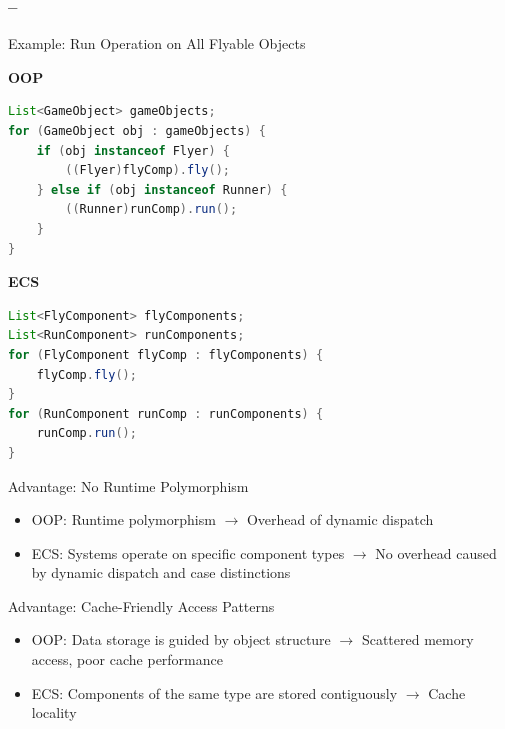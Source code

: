 \begin{frame}[fragile]
    \frametitle{\insertsection{} -- \insertsubsection{}}
    \begin{example}{Example: Run Operation on All Flyable Objects}
        \begin{fancycolumns}[widths={50,50}]
            \textbf{OOP}
            \begin{lstlisting}[language=Java, basicstyle=\footnotesize,frame=single,backgroundcolor=\color{gray}]
List<GameObject> gameObjects;
for (GameObject obj : gameObjects) {
    if (obj instanceof Flyer) {
        ((Flyer)flyComp).fly();
    } else if (obj instanceof Runner) {
        ((Runner)runComp).run();
    }
}
            \end{lstlisting}
            \nextcolumn
            \textbf{ECS}
            \begin{lstlisting}[language=Java, basicstyle=\footnotesize,backgroundcolor=\color{gray},frame=single]
List<FlyComponent> flyComponents;
List<RunComponent> runComponents;
for (FlyComponent flyComp : flyComponents) {
    flyComp.fly();
}
for (RunComponent runComp : runComponents) {
    runComp.run();
}

                \end{lstlisting}
        \end{fancycolumns}
    \end{example}
    \begin{fancycolumns}[widths={50,50}]
        \begin{motivation}{Advantage: No Runtime Polymorphism}
            \begin{itemize}
                \item OOP: Runtime polymorphism $\rightarrow$ Overhead of dynamic dispatch
                \item ECS: Systems operate on specific component types $\rightarrow$ No overhead caused by dynamic dispatch and case distinctions
            \end{itemize}
        \end{motivation}
        \nextcolumn
        \begin{motivation}{Advantage: Cache-Friendly Access Patterns}
            \begin{itemize}
                \item OOP: Data storage is guided by object structure $\rightarrow$ Scattered memory access, poor cache performance
                \item ECS: Components of the same type are stored contiguously $\rightarrow$ Cache locality
            \end{itemize}
        \end{motivation}
    \end{fancycolumns}

\end{frame}

